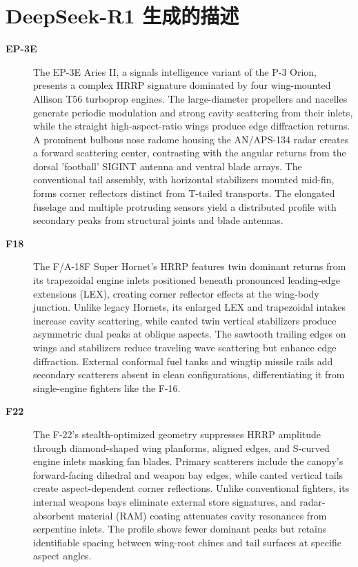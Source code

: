 \section{DeepSeek-R1 生成的描述}
\label{sec:deepseek_desc}
\footnotesize
{\begin{description}
    \item[\textbf{EP-3E}]
    The EP-3E Aries II, a signals intelligence variant of the P-3 Orion, presents a complex HRRP signature dominated by four wing-mounted Allison T56 turboprop engines. The large-diameter propellers and nacelles generate periodic modulation and strong cavity scattering from their inlets, while the straight high-aspect-ratio wings produce edge diffraction returns. A prominent bulbous nose radome housing the AN/APS-134 radar creates a forward scattering center, contrasting with the angular returns from the dorsal 'football' SIGINT antenna and ventral blade arrays. The conventional tail assembly, with horizontal stabilizers mounted mid-fin, forms corner reflectors distinct from T-tailed transports. The elongated fuselage and multiple protruding sensors yield a distributed profile with secondary peaks from structural joints and blade antennas.

    \item[\textbf{F18}]
    The F/A-18F Super Hornet’s HRRP features twin dominant returns from its trapezoidal engine inlets positioned beneath pronounced leading-edge extensions (LEX), creating corner reflector effects at the wing-body junction. Unlike legacy Hornets, its enlarged LEX and trapezoidal intakes increase cavity scattering, while canted twin vertical stabilizers produce asymmetric dual peaks at oblique aspects. The sawtooth trailing edges on wings and stabilizers reduce traveling wave scattering but enhance edge diffraction. External conformal fuel tanks and wingtip missile rails add secondary scatterers absent in clean configurations, differentiating it from single-engine fighters like the F-16.

    \item[\textbf{F22}]
    The F-22’s stealth-optimized geometry suppresses HRRP amplitude through diamond-shaped wing planforms, aligned edges, and S-curved engine inlets masking fan blades. Primary scatterers include the canopy’s forward-facing dihedral and weapon bay edges, while canted vertical tails create aspect-dependent corner reflections. Unlike conventional fighters, its internal weapons bays eliminate external store signatures, and radar-absorbent material (RAM) coating attenuates cavity resonances from serpentine inlets. The profile shows fewer dominant peaks but retains identifiable spacing between wing-root chines and tail surfaces at specific aspect angles.


\end{description}}
